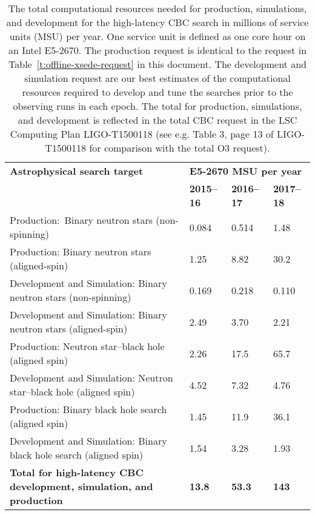 \begin{table}[!h]
\centering
{\small
\begin{tabular}{|l|l|l|l|}
\hline 
{\bf Astrophysical search target}  & \multicolumn{3}{l|}{\bf E5-2670 MSU per year}\\

{ } &  {\bf 2015--16} & {\bf 2016--17} & {\bf 2017--18}  \\\hline\hline
{ Production:\, Binary neutron stars (non-spinning)} & 0.084 & 0.514 & 1.48 \\\hline
{ Production: Binary neutron stars (aligned-spin)} & 1.25 & 8.82 & 30.2 \\\hline
{ Development and Simulation: Binary neutron stars (non-spinning) } &  0.169 &  0.218 &  0.110 \\\hline
{ Development and Simulation: Binary neutron stars (aligned-spin) } &  2.49 &  3.70 &  2.21 \\\hline\hline
{ Production: Neutron star--black hole (aligned spin) } & 2.26 & 17.5 & 65.7 \\\hline
{ Development and Simulation: Neutron star--black hole (aligned spin) } &  4.52 & 7.32 & 4.76 \\\hline\hline
{ Production: Binary black hole search  (aligned spin) } &1.45 & 11.9 & 36.1 \\\hline
{ Development and Simulation: Binary black hole search  (aligned spin) } & 1.54 & 3.28 & 1.93 \\\hline\hline
{ \bf Total for high-latency CBC development, simulation, and production } & \bf 13.8 & \bf 53.3 & \bf 143 \\\hline
\end{tabular}
}
\caption{\label{t:offline-xsede-all}
The total computational resources needed for production, simulations, and
development for the high-latency CBC search in millions of service units (MSU) per
year. One service unit is defined as one core hour on an Intel\textsuperscript{\textregistered} 
E5-2670.  The production request is identical to the request in Table~\ref{t:offline-xsede-request} in this document. The development and simulation request are our best estimates of the computational resources required to develop and tune the searches prior to the observing runs in each epoch. The total for production, simulations, and
development is reflected in the total CBC request in the LSC Computing Plan
LIGO-T1500118 (see e.g. Table 3, page 13 of LIGO-T1500118 for comparison with
the total O3 request).
}
\end{table}

